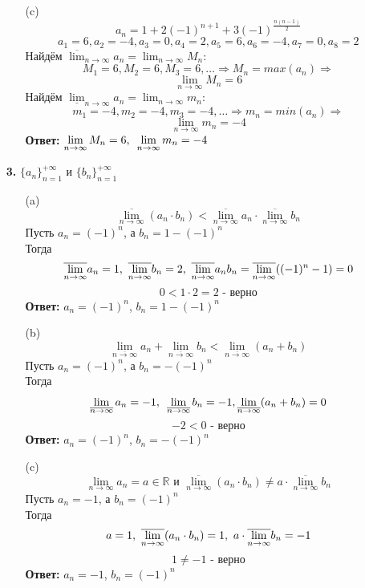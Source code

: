 \documentclass[a4paper]{article}
\renewcommand{\f}[2]{\frac{#1}{#2}}
\newcommand{\ts}{\text{\space}}
\newcommand{\lm}[1]{\lim\limits_{#1}}
\renewcommand{\r}{\Rightarrow}
\newcommand{\RR}{\mathbb{R}}
\begin{document}
\begin{enumerate}
\begin{enumerate}
        \item[(c)]$$a_n = 1+2(-1)^{n+1} + 3(-1)^{\f{n(n-1)}{2}}$$
        {\small $$a_1 = 6, a_2 = -4, a_3 = 0, a_4 = 2, a_5 = 6, a_6 = -4, a_7 = 0, a_8 = 2$$}
        Найдём $\overline{\lim}_{n \to \infty} a_n= \lim_{n \to \infty} M_n$:
        $$M_1 = 6, M_2 = 6, M_3 = 6, \dots \r M_n = max(a_n) \r $$
        $$\lim_{n \to \infty} M_n = 6$$
        Найдём $\underline{\lim}_{n \to \infty} a_n= \lim_{n \to \infty} m_n$:
        $$m_1 = -4, m_2 = -4, m_3 = -4, \dots \r m_n = min(a_n) \r $$
        $$\lim_{n \to \infty} m_n = -4$$
        \textbf{Ответ: } $\lim\limits_{n \to \infty} M_n = 6, \ts \lim\limits_{n \to \infty} m_n = -4$
    \end{enumerate}

    \item[\textbf{3.}]$\{a_n\}_{n=1}^{+\infty}$ и $\{b_n\}_{n=1}^{+\infty}$
    \begin{enumerate}
        \item[(a)]
        $$\overline{\lm{n \to \infty}}(a_n \cdot b_n) < \overline{\lm{n \to \infty}} a_n \cdot \overline{\lm{n \to \infty}}b_n$$
        Пусть $a_n = (-1)^n$, а $b_n = 1- (-1)^n$\\
        Тогда $$\overline{\lm{n \to \infty}}a_n = 1, \ts \overline{\lm{n \to \infty}}b_n = 2, \ts \overline{\lm{n \to \infty}}a_nb_n = \overline{\lm{n \to \infty}}((-1)^n - 1) = 0$$
        $$0 < 1\cdot 2 = 2 \text{ - верно}$$
        \textbf{Ответ: } $a_n = (-1)^n$, $b_n = 1- (-1)^n$

        \item[(b)]$$\lm{\overline{n \to \infty}}a_n + \lm{\overline{n \to \infty}}b_n < \lm{\overline{n \to \infty}}(a_n + b_n)$$
        Пусть $a_n = (-1)^n$, а $b_n = -(-1)^n$\\
        Тогда $$\lm{\overline{n \to \infty}}a_n = -1, \ts \lm{\overline{n \to \infty}}b_n = -1, \lm{\overline{n \to \infty}}(a_n + b_n) = 0$$
        $$-2 < 0 \text{ - верно}$$
        \textbf{Ответ: } $a_n = (-1)^n$, $b_n = -(-1)^n$

        \item[(c)]
        $$\lm{n \to \infty} a_n = a \in \RR \text{ и } \overline{\lm{n \to \infty}}(a_n \cdot b_n) \neq a \cdot \overline{\lm{n \to \infty}}b_n$$
        Пусть $a_n = -1$, а $b_n = (-1)^n$\\
        Тогда
        $$a = 1, \ts \overline{\lm{n \to \infty}}(a_n \cdot b_n) = 1, \ts a \cdot \overline{\lm{n \to \infty}}b_n = -1$$
        $$1 \neq -1 \text{ - верно}$$
        \textbf{Ответ: } $a_n = -1$, $b_n = (-1)^n$
    \end{enumerate}


\end{enumerate}
\end{document}
